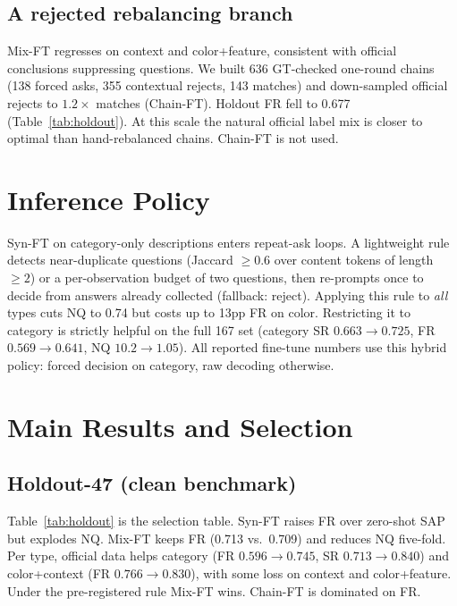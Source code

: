 \documentclass[10pt,a4paper]{article}
\begin{document}
\subsection{A rejected rebalancing branch}
Mix-FT regresses on context and color+feature, consistent with
official conclusions suppressing questions. We built 636
GT-checked one-round chains (138 forced asks, 355 contextual rejects,
143 matches) and down-sampled official rejects to $1.2\times$ matches
(Chain-FT). Holdout FR fell to 0.677 (Table~\ref{tab:holdout}). At this
scale the natural official label mix is closer to optimal than
hand-rebalanced chains. Chain-FT is not used.

\section{Inference Policy}
\label{sec:policy}

Syn-FT on category-only descriptions enters repeat-ask loops. A
lightweight rule detects near-duplicate questions (Jaccard $\geq 0.6$
over content tokens of length $\geq 2$) or a per-observation budget of
two questions, then re-prompts once to decide from answers already
collected (fallback: reject). Applying this rule to \emph{all} types cuts NQ to 0.74 but
costs up to 13pp FR on color. Restricting it to category is strictly
helpful on the full 167 set (category SR $0.663\rightarrow 0.725$,
FR $0.569\rightarrow 0.641$, NQ $10.2\rightarrow 1.05$). All reported
fine-tune numbers use this hybrid policy: forced decision on category,
raw decoding otherwise.

\section{Main Results and Selection}
\label{sec:main}

\subsection{Holdout-47 (clean benchmark)}
Table~\ref{tab:holdout} is the selection table. Syn-FT raises FR over
zero-shot SAP but explodes NQ. Mix-FT keeps FR (0.713 vs.\ 0.709) and
reduces NQ five-fold. Per type, official data helps category
(FR $0.596\rightarrow 0.745$, SR $0.713\rightarrow 0.840$) and
color+context (FR $0.766\rightarrow 0.830$), with some loss on context
and color+feature. Under the pre-registered rule Mix-FT wins. Chain-FT
is dominated on FR.
\end{document}

